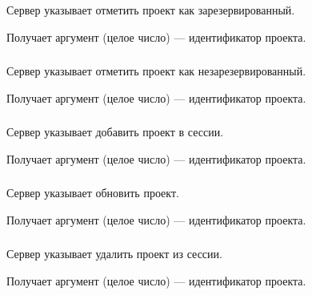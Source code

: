 Сервер указывает отметить проект как зарезервированный.

Получает аргумент  (целое число) — идентификатор проекта.

\subsubsection{}

Сервер указывает отметить проект как незарезервированный.

Получает аргумент  (целое число) — идентификатор проекта.

\subsubsection{}

Сервер указывает добавить проект в сессии.

Получает аргумент  (целое число) — идентификатор проекта.

\subsubsection{}

Сервер указывает обновить проект.

Получает аргумент  (целое число) — идентификатор проекта.

\subsubsection{}

Сервер указывает удалить проект из сессии.

Получает аргумент  (целое число) — идентификатор проекта.
